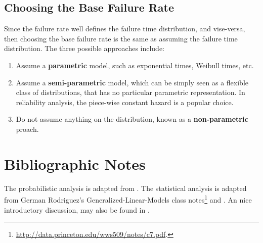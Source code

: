 \subsection{Choosing the Base Failure Rate}
Since the failure rate well defines the failure time distribution, and vise-versa, then choosing the base failure rate is the same as assuming the failure time distribution.
The three possible approaches include:
\begin{enumerate}
\item Assume a \textbf{parametric} model, such as exponential times, Weibull times, etc.
\item Assume a \textbf{semi-parametric} model, which can be simply seen as a flexible class of distributions, that has no particular parametric representation. In reliability analysis, the piece-wise constant hazard is a popular choice.
\item Do not assume anything on the distribution, known as a \textbf{non-parametric} proach. 
\end{enumerate}



\section{Bibliographic Notes}
The probabilistic analysis is adapted from \cite{aven_stochastic_1999}.
The statistical analysis is adapted from German Rodriguez's Generalized-Linear-Models class notes\footnote{\url{http://data.princeton.edu/wws509/notes/c7.pdf}.} and \cite[Ch.8]{natrella_nist/sematech_2010}. 
An nice introductory discussion, may also be found in \cite{nahmias_production_2015}. 

